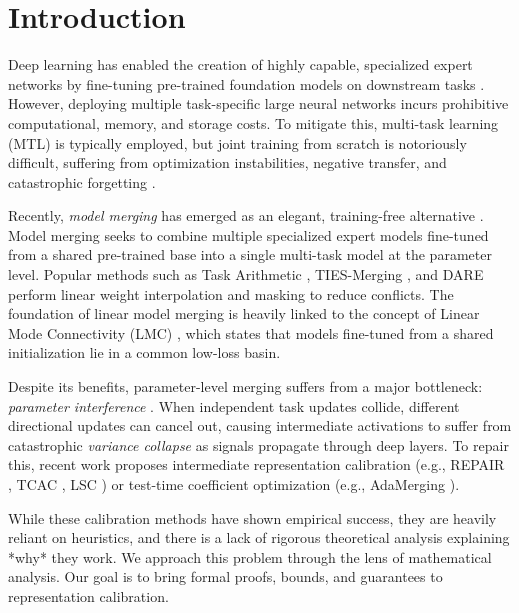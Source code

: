 \documentclass{article}
\theoremstyle{plain}
\theoremstyle{definition}
\theoremstyle{remark}
\begin{document}
\section{Introduction}
Deep learning has enabled the creation of highly capable, specialized expert networks by fine-tuning pre-trained foundation models on downstream tasks \cite{he2016deep, devlin2018bert, brown2020language, dosovitskiy2020vit, radford2021learning, touvron2023llama, raffel2020t5}. However, deploying multiple task-specific large neural networks incurs prohibitive computational, memory, and storage costs. To mitigate this, multi-task learning (MTL) is typically employed, but joint training from scratch is notoriously difficult, suffering from optimization instabilities, negative transfer, and catastrophic forgetting \cite{kirkpatrick2017overcoming, zenke2017continual, chaudhry2018efficient, lopez2017gradient, zhang2021survey}.

Recently, \textit{model merging} has emerged as an elegant, training-free alternative \cite{wortsman2022model, matena2022merging, jin2022dataless, sanyal2024model}. Model merging seeks to combine multiple specialized expert models fine-tuned from a shared pre-trained base into a single multi-task model at the parameter level. Popular methods such as Task Arithmetic \cite{ilharco2023editing}, TIES-Merging \cite{yadav2023ties}, and DARE \cite{yu2024language} perform linear weight interpolation and masking to reduce conflicts. The foundation of linear model merging is heavily linked to the concept of Linear Mode Connectivity (LMC) \cite{garipov2018loss, draxler2018essentially, frankle2020linear, entezari2021role, ainsworth2022git}, which states that models fine-tuned from a shared initialization lie in a common low-loss basin.

Despite its benefits, parameter-level merging suffers from a major bottleneck: \textit{parameter interference} \cite{sanyal2024model}. When independent task updates collide, different directional updates can cancel out, causing intermediate activations to suffer from catastrophic \textit{variance collapse} as signals propagate through deep layers. To repair this, recent work proposes intermediate representation calibration (e.g., REPAIR \cite{jordan2023repair}, TCAC \cite{anonymous2026pragmatic}, LSC \cite{anonymous2026less}) or test-time coefficient optimization (e.g., AdaMerging \cite{yang2024adamerging}).

While these calibration methods have shown empirical success, they are heavily reliant on heuristics, and there is a lack of rigorous theoretical analysis explaining *why* they work. We approach this problem through the lens of mathematical analysis. Our goal is to bring formal proofs, bounds, and guarantees to representation calibration.
\end{document}
